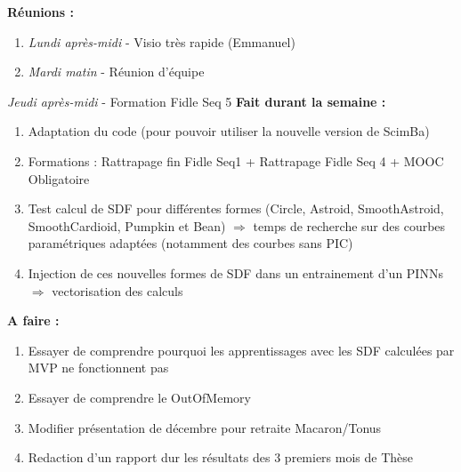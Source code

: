 \textbf{Réunions :}
\begin{enumerate}[label=\textbullet]
	\item \textit{Lundi après-midi} - Visio très rapide (Emmanuel)
	\item \textit{Mardi matin} - Réunion d'équipe\end{enumerate}
	\item \textit{Jeudi après-midi} - Formation Fidle Seq 5
\textbf{Fait durant la semaine :}
\begin{enumerate}[label=\textbullet]
	\item Adaptation du code (pour pouvoir utiliser la nouvelle version de ScimBa)
	\item Formations : Rattrapage fin Fidle Seq1 + Rattrapage Fidle Seq 4 + MOOC Obligatoire
    \item Test calcul de SDF pour différentes formes (Circle, Astroid, SmoothAstroid, SmoothCardioid, Pumpkin et Bean) $\Rightarrow$ temps de recherche sur des courbes paramétriques adaptées (notamment des courbes sans PIC)
    \item Injection de ces nouvelles formes de SDF dans un entrainement d'un PINNs $\Rightarrow$ vectorisation des calculs
\end{enumerate}
\textbf{A faire :}
\begin{enumerate}[label=\textbullet]
	\item Essayer de comprendre pourquoi les apprentissages avec les SDF calculées par MVP ne fonctionnent pas
	\item Essayer de comprendre le OutOfMemory 
	\item Modifier présentation de décembre pour retraite Macaron/Tonus
	\item Redaction d'un rapport dur les résultats des 3 premiers mois de Thèse
\end{enumerate}